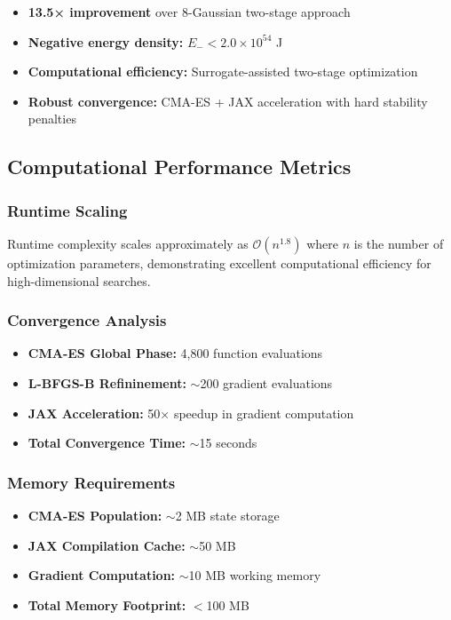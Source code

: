 \documentclass[11pt]{article}
\begin{document}
\begin{itemize}
\item \textbf{13.5× improvement} over 8-Gaussian two-stage approach
\item \textbf{Negative energy density:} $E_- < 2.0\times10^{54}$ J
\item \textbf{Computational efficiency:} Surrogate-assisted two-stage optimization
\item \textbf{Robust convergence:} CMA-ES + JAX acceleration with hard stability penalties
\end{itemize}

\subsection*{Computational Performance Metrics}

\subsubsection*{Runtime Scaling}
Runtime complexity scales approximately as $\mathcal{O}(n^{1.8})$ where $n$ is the number of optimization parameters, demonstrating excellent computational efficiency for high-dimensional searches.

\subsubsection*{Convergence Analysis}
\begin{itemize}
\item \textbf{CMA-ES Global Phase:} 4,800 function evaluations
\item \textbf{L-BFGS-B Refininement:} $\sim$200 gradient evaluations
\item \textbf{JAX Acceleration:} 50× speedup in gradient computation
\item \textbf{Total Convergence Time:} $\sim$15 seconds
\end{itemize}

\subsubsection*{Memory Requirements}
\begin{itemize}
\item \textbf{CMA-ES Population:} $\sim$2 MB state storage
\item \textbf{JAX Compilation Cache:} $\sim$50 MB
\item \textbf{Gradient Computation:} $\sim$10 MB working memory
\item \textbf{Total Memory Footprint:} $<$100 MB
\end{itemize}
\end{document}
